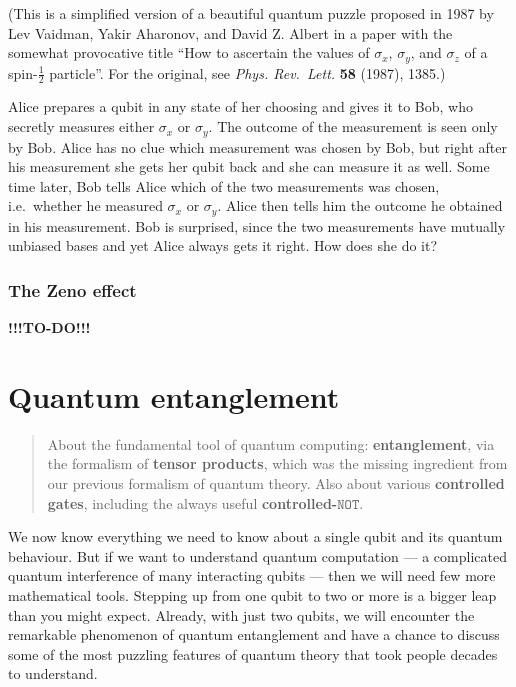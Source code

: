 \documentclass[fleqn]{article}
\let\oldsection\section
\renewcommand\section{\clearpage\oldsection}
\begin{document}
(This is a simplified version of a beautiful quantum puzzle proposed in 1987 by Lev Vaidman, Yakir Aharonov, and David Z. Albert in a paper with the somewhat provocative title ``How to ascertain the values of \(\sigma_x\), \(\sigma_y\), and \(\sigma_z\) of a spin-\(\frac12\) particle''. For the original, see \emph{Phys. Rev.~Lett.} \textbf{58} (1987), 1385.)

Alice prepares a qubit in any state of her choosing and gives it to Bob, who secretly measures either \(\sigma_x\) or \(\sigma_y\).
The outcome of the measurement is seen only by Bob.
Alice has no clue which measurement was chosen by Bob, but right after his measurement she gets her qubit back and she can measure it as well.
Some time later, Bob tells Alice which of the two measurements was chosen, i.e.~whether he measured \(\sigma_x\) or \(\sigma_y\).
Alice then tells him the outcome he obtained in his measurement.
Bob is surprised, since the two measurements have mutually unbiased bases and yet Alice always gets it right.
How does she do it?

\hypertarget{the-zeno-effect}{%
\subsubsection{The Zeno effect}\label{the-zeno-effect}}

\textbf{!!!TO-DO!!!}

\hypertarget{quantum-entanglement}{%
\section{Quantum entanglement}\label{quantum-entanglement}}

\begin{quote}
About the fundamental tool of quantum computing: \textbf{entanglement}, via the formalism of \textbf{tensor products}, which was the missing ingredient from our previous formalism of quantum theory.
Also about various \textbf{controlled gates}, including the always useful \textbf{controlled-\(\texttt{NOT}\)}.
\end{quote}

We now know everything we need to know about a single qubit and its quantum behaviour.
But if we want to understand quantum computation --- a complicated quantum interference of many interacting qubits --- then we will need few more mathematical tools.
Stepping up from one qubit to two or more is a bigger leap than you might expect.
Already, with just two qubits, we will encounter the remarkable phenomenon of quantum entanglement and have a chance to discuss some of the most puzzling features of quantum theory that took people decades to understand.
\end{document}
